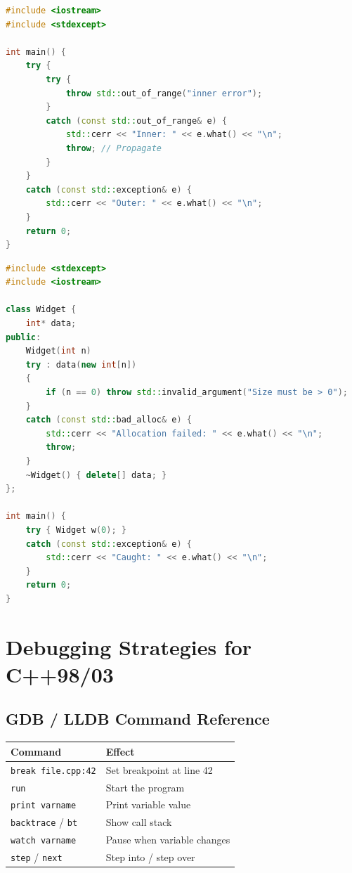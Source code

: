 \begin{lstlisting}[language=C++, caption={Nested try-catch}]
#include <iostream>
#include <stdexcept>

int main() {
    try {
        try {
            throw std::out_of_range("inner error");
        }
        catch (const std::out_of_range& e) {
            std::cerr << "Inner: " << e.what() << "\n";
            throw; // Propagate
        }
    }
    catch (const std::exception& e) {
        std::cerr << "Outer: " << e.what() << "\n";
    }
    return 0;
}
\end{lstlisting}

\begin{lstlisting}[language=C++, caption={Constructor function try block}]
#include <stdexcept>
#include <iostream>

class Widget {
    int* data;
public:
    Widget(int n)
    try : data(new int[n])
    {
        if (n == 0) throw std::invalid_argument("Size must be > 0");
    }
    catch (const std::bad_alloc& e) {
        std::cerr << "Allocation failed: " << e.what() << "\n";
        throw;
    }
    ~Widget() { delete[] data; }
};

int main() {
    try { Widget w(0); }
    catch (const std::exception& e) {
        std::cerr << "Caught: " << e.what() << "\n";
    }
    return 0;
}
\end{lstlisting}

\section{Debugging Strategies for C++98/03}
\label{sec:debugging}

\subsection{GDB / LLDB Command Reference}

\begin{center}
\begin{tabular}{|l|l|}
\hline
\textbf{Command} & \textbf{Effect} \\
\hline
\texttt{break file.cpp:42}  & Set breakpoint at line 42 \\
\texttt{run}                & Start the program \\
\texttt{print varname}      & Print variable value \\
\texttt{backtrace} / \texttt{bt} & Show call stack \\
\texttt{watch varname}      & Pause when variable changes \\
\texttt{step} / \texttt{next}  & Step into / step over \\
\hline
\end{tabular}
\end{center}

